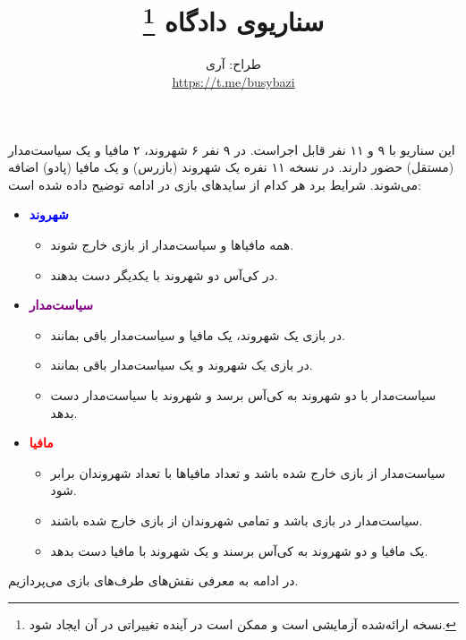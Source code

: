 \documentclass[12pt]{extarticle}
\title{
سناریوی دادگاه
	\footnote{
نسخه ارائه‌شده آزمایشی است و ممکن است در آینده تغییراتی در آن ایجاد شود.
	}
}
\author{
طراح: آری
	\\[0.2cm]
	\url{https://t.me/busybazi}
}
\date{}
\begin{document}
\maketitle

این سناریو با ۹ و ۱۱ نفر قابل اجراست. در ۹ نفر ۶ شهروند، ۲ مافیا و یک سیاست‌مدار (مستقل) حضور دارند. در نسخه ۱۱ نفره یک شهروند (بازرس) و یک مافیا (پادو) اضافه می‌شوند. شرایط برد هر کدام از سایدهای بازی در ادامه توضیح داده شده است:

\begin{itemize}
	\item[] \textbf{\textcolor{blue}{شهروند}}
	      \begin{itemize}
		      \item
		            همه مافیاها و سیاست‌مدار از بازی خارج شوند.
		      \item
		            در کی‌آس دو شهروند با یکدیگر دست بدهند.
	      \end{itemize}
	\item[] \textbf{\textcolor{purple}{سیاست‌مدار}}
	      \begin{itemize}
		      \item
		            در بازی یک شهروند، یک مافیا و سیاست‌مدار باقی بمانند.
		      \item
		            در بازی یک شهروند و یک سیاست‌مدار باقی بمانند.
		      \item
		            سیاست‌مدار با دو شهروند به کی‌آس برسد و شهروند با سیاست‌مدار دست بدهد.
	      \end{itemize}
	\item[] \textbf{\textcolor{red}{مافیا}}
	      \begin{itemize}
		      \item
		            سیاست‌مدار از بازی خارج شده باشد و تعداد مافیاها با تعداد شهروندان برابر شود.
		      \item
		            سیاست‌مدار در بازی باشد و تمامی شهروندان از بازی خارج شده‌ باشند.
		      \item
		            یک مافیا و دو شهروند به کی‌آس برسند و یک  شهروند با مافیا دست بدهد.
	      \end{itemize}
\end{itemize}


در ادامه به معرفی نقش‌های طرف‌های بازی می‌پردازیم.

\clearpage
\renewcommand{\contentsname}{نقش‌های بازی}
\setcounter{tocdepth}{1}

\tableofcontents

\setlength{\baselineskip}{1.2\baselineskip}
\end{document}
